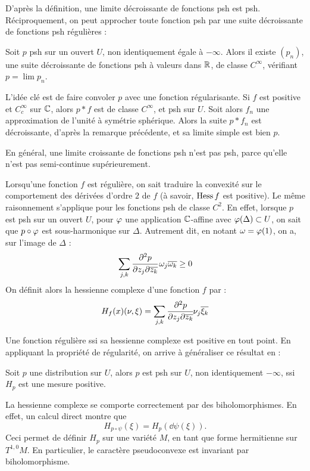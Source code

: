 D'après la définition, une limite décroissante de fonctions psh est psh. Réciproquement, on peut approcher toute fonction psh par une suite décroissante de fonctions psh régulières :
\begin{prop}
	Soit $p$ psh sur un ouvert $U$, non identiquement égale à $-\infty$. Alors il existe $(p_n)$, une suite décroissante de fonctions psh à valeurs dans $\mathbb{R}$, de classe $C^{\infty}$, vérifiant $p=\lim p_n$.
\end{prop}
\begin{preuve}
	L'idée clé est de faire convoler $p$ avec une fonction régularisante. Si $f$ est positive et $C^{\infty}_c$ sur $\mathbb{C}$, alors $p * f$ est de classe $C^{\infty}$, et psh sur $U$.
	Soit alors $f_n$ une approximation de l'unité à symétrie sphérique. Alors la suite $p * f_n$ est décroissante, d'après la remarque précédente, et sa limite simple est bien $p$.
\end{preuve}
En général, une limite croissante de fonctions psh n'est pas psh, parce qu'elle n'est pas semi-continue supérieurement.

Lorsqu'une fonction $f$ est régulière, on sait traduire la convexité sur le comportement des dérivées d'ordre $2$ de $f$ (à savoir, $\operatorname{Hess} f$ est positive). Le même raisonnement s'applique pour les fonctions psh de classe $C^2$. En effet, lorsque $p$ est psh sur un ouvert $U$, pour $\varphi$ une application $\mathbb{C}$-affine avec $\varphi(\Delta) \subset U$, on sait que $p \circ \varphi$ est sous-harmonique sur $\Delta$. Autrement dit, en notant $\omega = \varphi(1)$, on a, sur l'image de $\Delta$ :
\begin{equation*}
	\sum_{j,k} \cfrac{\partial^2 p}{\partial z_j\partial\overline{z_k}}\,\omega_j\overline{\omega_k} \geq 0
\end{equation*}
On définit alors la hessienne complexe d'une fonction $f$ par :
\begin{equation*}
	H_f(x)(\nu,\xi) = \sum_{j,k}\cfrac{\partial^2p}{\partial z_j\partial \overline{z_k}}\nu_j\overline{\xi_k}
\end{equation*}

Une fonction régulière ssi sa hessienne complexe est positive en tout point. En appliquant la propriété de régularité, on arrive à généraliser ce résultat en :
\begin{prop}
	Soit $p$ une distribution sur $U$, alors $p$ est psh sur $U$, non identiquement $-\infty$, ssi $H_p$ est une mesure positive.
\end{prop}

La hessienne complexe se comporte correctement par des
biholomorphismes. En effet, un calcul direct montre que 
\begin{equation*}
  H_{p\circ \psi}(\xi)=H_p(\dd\psi(\xi)).
\end{equation*}
Ceci permet de définir $H_p$ sur une variété $M$, en tant que forme hermitienne sur $T^{1,0}M$. En particulier, le caractère pseudoconvexe est invariant par biholomorphisme.

